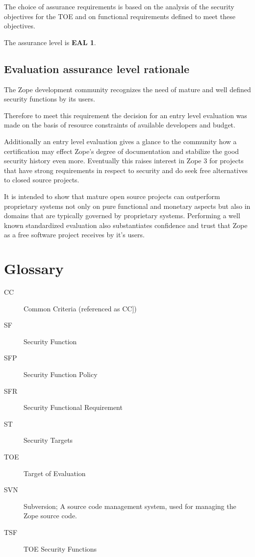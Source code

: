 \documentclass[12pt,english]{scrbook}
\begin{document}
The choice of assurance requirements is based on the analysis of the security
objectives for the TOE and on functional requirements defined to meet these
objectives.

The assurance level is \textbf{EAL 1}.



\section{Evaluation assurance level rationale}

The Zope development community recognizes the need of mature and well defined
security functions by its users.

Therefore to meet this requirement the decision for an entry level evaluation
was made on the basis of resource constraints of available developers and
budget.

Additionally an entry level evaluation gives a glance to the community how a
certification may effect Zope's degree of documentation and stabilize the good
security history even more. Eventually this raises interest in Zope 3 for
projects that have strong requirements in respect to security and do seek free
alternatives to closed source projects.

It is intended to show that mature open source projects can outperform
proprietary systems not only on pure functional and monetary aspects but also
in domains that are typically governed by proprietary systems. Performing a
well known standardized evaluation also substantiates confidence and trust that
Zope as a free software project receives by it's users.




\chapter{Glossary}

\begin{description}

  \item[CC] Common Criteria (referenced as CC])
  \item[SF] Security Function
  \item[SFP] Security Function Policy
  \item[SFR] Security Functional Requirement
  \item[ST] Security Targets
  \item[TOE] Target of Evaluation
  \item[SVN] Subversion; A source code management system, used for managing the Zope source code.
  \item[TSF] TOE Security Functions

\end{description} 

\end{document}
